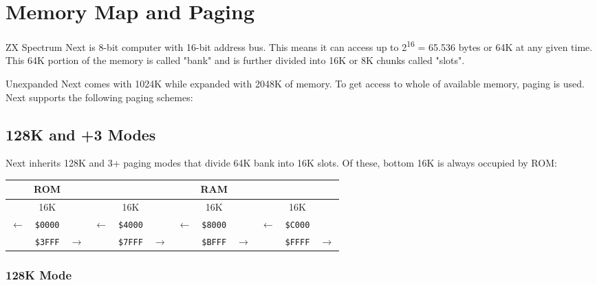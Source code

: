 \documentclass[oneside,a4paper]{book}
\newcommand{\notet}{\rule{0pt}{2.4ex}}
\newcommand{\noteb}{\rule[-1.3ex]{0pt}{0pt}}
\begin{document}
\section{Memory Map and Paging}
\label{zx_next_memorypaging}

\newcommand{\colnoline}[1]{\multicolumn{1}{c}{#1}}

ZX Spectrum Next is 8-bit computer with 16-bit address bus. This means it can access up to 2\textsuperscript{16} = 65.536 bytes or 64K at any given time. This 64K portion of the memory is called "bank" and is further divided into 16K or 8K chunks called "slots".

Unexpanded Next comes with 1024K while expanded with 2048K of memory. To get access to whole of available memory, paging is used. Next supports the following paging schemes:

\subsection{128K and +3 Modes}

Next inherits 128K and 3+ paging modes that divide 64K bank into 16K slots. Of these, bottom 16K is always occupied by ROM:

\begingroup
	\setlength{\tabcolsep}{1pt}
	\begin{tabular}{|ccc|ccc|ccc|ccc|}
		\hline
		\multicolumn{3}{|c}{ROM}\notet\noteb &
			\multicolumn{9}{|c|}{RAM} \\
		\hline
		\multicolumn{3}{|c}{16K}\notet\noteb &
			\multicolumn{3}{|c}{16K} &
			\multicolumn{3}{|c}{16K} &
			\multicolumn{3}{|c|}{16K} \\
		\hline
		\colnoline{$\leftarrow$}\notet & \colnoline{\tt \$0000} & \colnoline{} &
			\colnoline{$\leftarrow$} & \colnoline{\tt \$4000} & \colnoline{} &
			\colnoline{$\leftarrow$} & \colnoline{\tt \$8000} & \colnoline{} &
			\colnoline{$\leftarrow$} & \colnoline{\tt \$C000} & \colnoline{} \\
		\colnoline{} & \colnoline{\tt \$3FFF} & \colnoline{$\rightarrow$} &
			\colnoline{} & \colnoline{\tt \$7FFF} & \colnoline{$\rightarrow$} &
			\colnoline{} & \colnoline{\tt \$BFFF} & \colnoline{$\rightarrow$} &
			\colnoline{} & \colnoline{\tt \$FFFF} & \colnoline{$\rightarrow$} \\
	\end{tabular}
\endgroup

\subsubsection{128K Mode}
\end{document}

